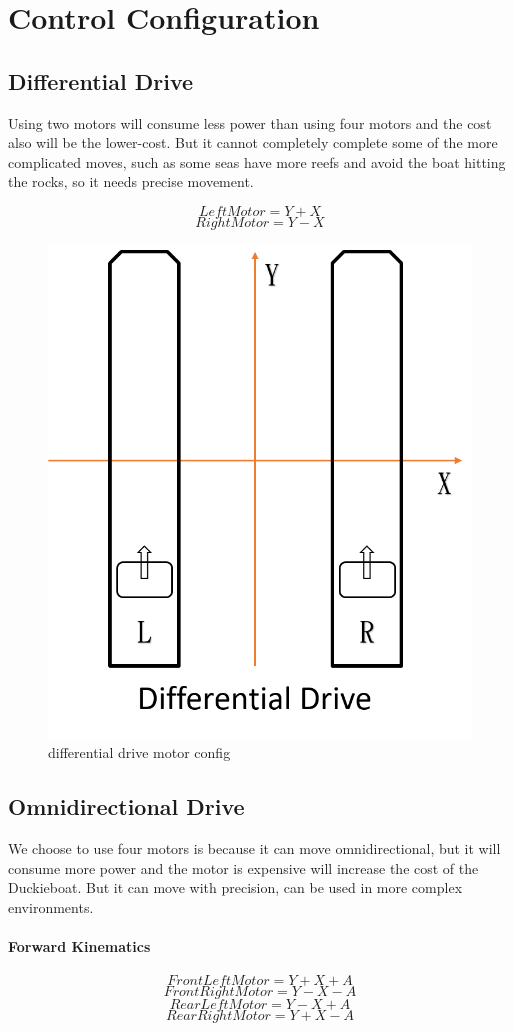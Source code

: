 \section{Control Configuration}

\subsection{Differential Drive}

Using two motors will consume less power than using four motors and the cost also will be the lower-cost. But it cannot completely complete some of the more complicated moves, such as some seas have more reefs and avoid the boat hitting the rocks, so it needs precise movement.

\[LeftMotor = Y + X\]
\[RightMotor = Y-X\]
\begin{figure}[h]
	\includegraphics[width=0.5\columnwidth]{images/differential_drive.png}
	\centering
	\caption{differential drive motor config}
	\label{figure:differential_drive}
\end{figure}

\subsection{Omnidirectional Drive}

We choose to use four motors is because it can move omnidirectional, but it will consume more power and the motor is expensive will increase the cost of the Duckieboat. But it can move with precision, can be used in more complex environments.

\paragraph{Forward Kinematics}
\[Front Left Motor = Y + X + A \]
\[Front Right Motor = Y - X - A \]
\[Rear Left Motor = Y - X + A \]
\[Rear Right Motor = Y + X - A\]

